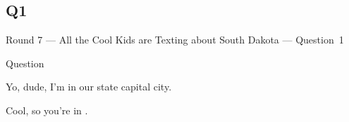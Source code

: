 \documentclass[11pt]{beamer}
\begin{document}
\subsection*{Q1}
\begin{frame}[t]{Round 7 --- All the Cool Kids are Texting about South Dakota --- \mbox{Question 1}}
\begin{block}{Question}

\begin{minipage}{0.9\textwidth}
\begin{mdframed}[
    roundcorner=7pt,
    backgroundcolor=black!5,
    linecolor=black!5,
    fontcolor=black,
    ignorelastdescenders]
\begin{flushleft}
{\small{}\selectfont{}
Yo, dude, I'm in our state capital city.
}
\end{flushleft}
\end{mdframed}
\end{minipage}

\hfill{}\begin{minipage}{0.9\textwidth}
\begin{mdframed}[
    roundcorner=7pt,
    backgroundcolor=blue!80!white,
    linecolor=blue!80!white,
    fontcolor=white,
    ignorelastdescenders]
\begin{flushleft}
{\small{}\selectfont{}
Cool, so you're in \textunderscore{}\textunderscore{}\textunderscore{}\textunderscore{}\textunderscore{}\textunderscore{}.
}
\end{flushleft}
\end{mdframed}
\end{minipage}
\end{block}
\end{frame}
\end{document}
